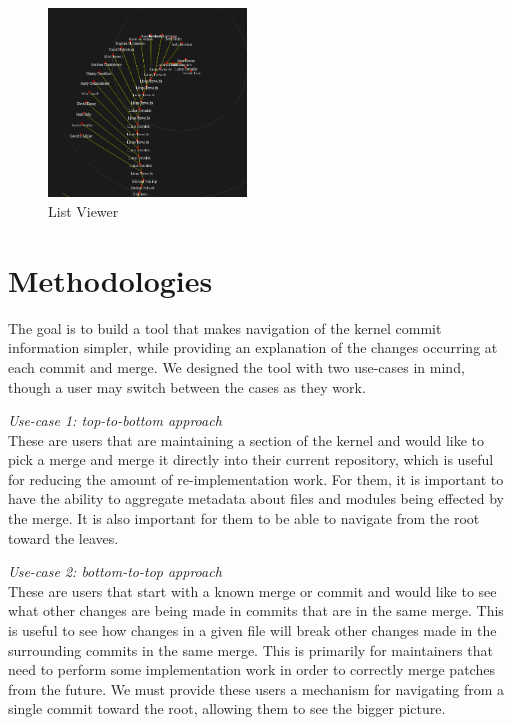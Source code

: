\documentclass[conference, draftclsnofoot, draft]{IEEEtran}
\begin{document}

\begin{figure}
        \centering
        \includegraphics[width=0.47\textwidth]{figures/gitvis.png}
        \caption{List Viewer}
        \label{fig:listviewer}
\end{figure}

\section{Methodologies}

The goal is to build a tool that makes navigation of the kernel commit information
simpler, while providing an explanation of the changes occurring at each commit and
merge. We designed the tool with two use-cases in mind, though a user may switch
between the cases as they work.

\textit{Use-case 1: top-to-bottom approach}\label{sec:usecase1}\\
These are users that are maintaining a section of the kernel and would like to pick
a merge and merge it directly into their current repository, which is useful for
reducing the amount of re-implementation work. For them, it is important to have the
ability to aggregate metadata about files and modules being effected by the merge.
It is also important for them to be able to navigate from the root toward the
leaves.

\textit{Use-case 2: bottom-to-top approach}\label{sec:usecase2}\\
These are users that start with a known merge or commit and would like to see what
other changes are being made in commits that are in the same merge. This is useful
to see how changes in a given file will break other changes made in the surrounding
commits in the same merge. This is primarily for maintainers that need to perform
some implementation work in order to correctly merge patches from the future. We
must provide these users a mechanism for navigating from a single commit toward the
root, allowing them to see the bigger picture.
\end{document}
